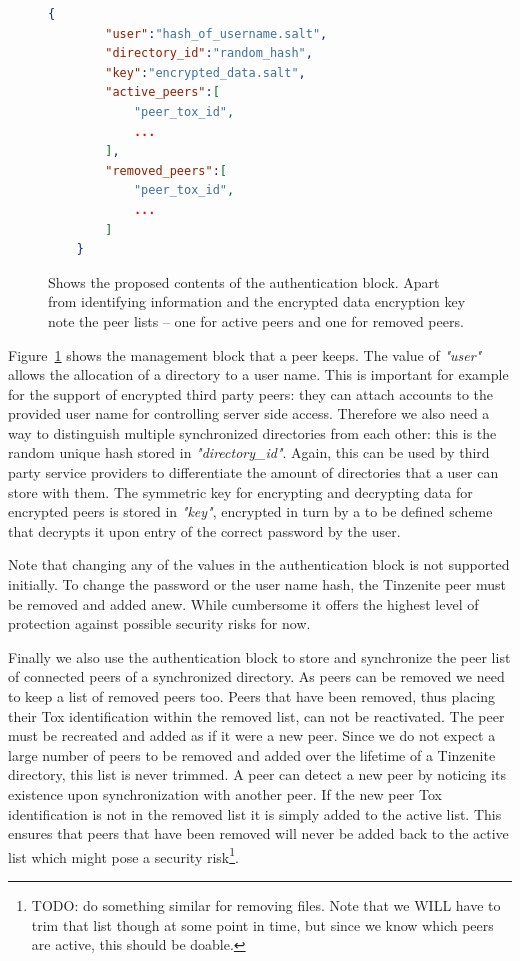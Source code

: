 \begin{figure}[htp]
    \begin{lstlisting}[language=json,firstnumber=0]
    {
        "user":"hash_of_username.salt",
        "directory_id":"random_hash",
        "key":"encrypted_data.salt",
        "active_peers":[
            "peer_tox_id",
            ...
        ],
        "removed_peers":[
            "peer_tox_id",
            ...
        ]
    }
    \end{lstlisting}
\caption[Authentication JSON Object]{Shows the proposed contents of the authentication block. Apart from identifying information and the encrypted data encryption key note the peer lists – one for active peers and one for removed peers.}
\label{json:auth_object}
\end{figure}

Figure~\ref{json:auth_object} shows the management block that a peer keeps.
The value of \textit{"user"} allows the allocation of a directory to a user name.
This is important for example for the support of encrypted third party peers: they can attach accounts to the provided user name for controlling server side access.
Therefore we also need a way to distinguish multiple synchronized directories from each other: this is the random unique hash stored in \textit{"directory\_id"}.
Again, this can be used by third party service providers to differentiate the amount of directories that a user can store with them.
The symmetric key for encrypting and decrypting data for encrypted peers is stored in \textit{"key"}, encrypted in turn by a to be defined scheme that decrypts it upon entry of the correct password by the user.

Note that changing any of the values in the authentication block is not supported initially.
To change the password or the user name hash, the Tinzenite peer must be removed and added anew.
While cumbersome it offers the highest level of protection against possible security risks for now.

Finally we also use the authentication block to store and synchronize the peer list of connected peers of a synchronized directory.
As peers can be removed we need to keep a list of removed peers too.
Peers that have been removed, thus placing their Tox identification within the removed list, can not be reactivated.
The peer must be recreated and added as if it were a new peer.
Since we do not expect a large number of peers to be removed and added over the lifetime of a Tinzenite directory, this list is never trimmed.
A peer can detect a new peer by noticing its existence upon synchronization with another peer.
If the new peer Tox identification is not in the removed list it is simply added to the active list.
This ensures that peers that have been removed will never be added back to the active list which might pose a security risk\footnote{TODO: do something similar for removing files. Note that we WILL have to trim that list though at some point in time, but since we know which peers are active, this should be doable.}.

